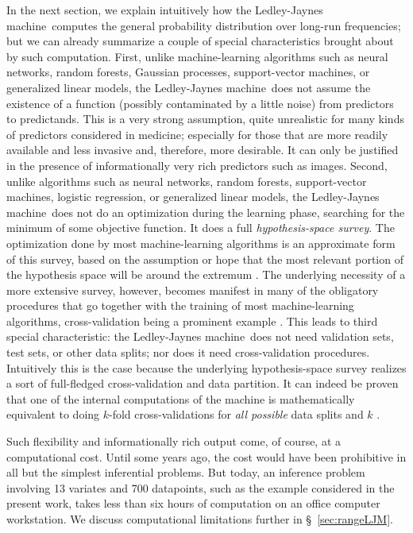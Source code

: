 \documentclass[utf8]{FrontiersinHarvard} %
\newcommand*{\sect}{\S}%
\newcommand*{\sects}{\S\S}%
\newcommand*{\chap}{ch.}%
\renewcommand*{\|}[1][]{\nonscript\:#1\vert\nonscript\:\mathopen{}}
\newcommand*{\ljm}{Ledley-Jaynes machine}
\begin{document}
In the next section, we explain intuitively how the \ljm\ computes the general probability distribution over long-run frequencies; but we can already summarize a couple of special characteristics brought about by such computation. First, unlike machine-learning algorithms such as neural networks, random forests, Gaussian processes, support-vector machines, or generalized linear models, the \ljm\ does not assume the existence of a function (possibly contaminated by a little noise) from predictors to predictands. This is a very strong assumption, quite unrealistic for many kinds of predictors considered in medicine; especially for those that are more readily available and less invasive and, therefore, more desirable. It can only be justified in the presence of informationally very rich predictors such as images. Second, unlike algorithms such as neural networks, random forests, support-vector machines, logistic regression, or generalized linear models, the \ljm\ does not do an optimization during the learning phase, searching for the minimum of some objective function. It does a full \emph{hypothesis-space survey}. %
The optimization done by most machine-learning algorithms is an approximate form of this survey, based on the assumption or hope that the most relevant portion of the hypothesis space will be around the extremum \citetext{\citealp[\chap~16]{mackay1992,murphy2012}; \citealp[see also][]{selfetal1987}}. The underlying necessity of a more extensive survey, however, becomes manifest in many of the obligatory procedures that go together with the training of most machine-learning algorithms, cross-validation being a prominent example \citep{mackay1992b}. This leads to third special characteristic: the \ljm\ does not need validation sets, test sets, or other data splits; nor does it need cross-validation procedures. Intuitively this is the case because the underlying hypothesis-space survey realizes a sort of full-fledged cross-validation and data partition. It can indeed be proven that one of the internal computations of the machine is mathematically equivalent to doing $k$-fold cross-validations for \emph{all possible} data splits and $k$ \citep{portamana2019b,fongetal2020}.

Such flexibility and informationally rich output come, of course, at a computational cost. Until some years ago, the cost would have been prohibitive in all but the simplest inferential problems. But today, an inference problem involving 13 variates and 700 datapoints, such as the example considered in the present work, takes less than six hours of computation on an office computer workstation. We discuss computational limitations further in \sect~\ref{sec:rangeLJM}.
\end{document}
